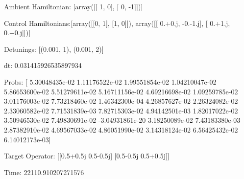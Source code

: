 \documentclass{article}
\begin{document}
    

\newpage

Ambient Hamiltonian: [array([[ 1,  0],
       [ 0, -1]])]

Control Hamiltonians:[array([[0, 1],
       [1, 0]]), array([[ 0.+0.j, -0.-1.j],
       [ 0.+1.j,  0.+0.j]])]

Detunings: [(0.001, 1), (0.001, 2)]

 dt: 0.031415926535897934

Probs: [ 5.30048435e-02  1.11176522e-02  1.99551854e-02  1.04210047e-02
  5.86653600e-02  5.51279611e-02  5.16711156e-02  4.69216698e-02
  1.09259785e-02  3.01176003e-02  7.73218460e-02  1.46342300e-04
  4.26857627e-02  2.26324082e-02  2.33060582e-02  7.71531839e-03
  7.82715303e-02  4.94142501e-03  1.82017022e-02  3.50946530e-02
  7.49830691e-02 -3.04931861e-20  3.18250089e-02  7.43183380e-03
  2.87382910e-02  4.69567033e-02  4.86051990e-02  3.14318124e-02
  6.56425432e-02  6.14012173e-03]

Target Operator: [[0.5+0.5j 0.5-0.5j]
 [0.5-0.5j 0.5+0.5j]]

Time: 22110.910207271576
\end{document}
